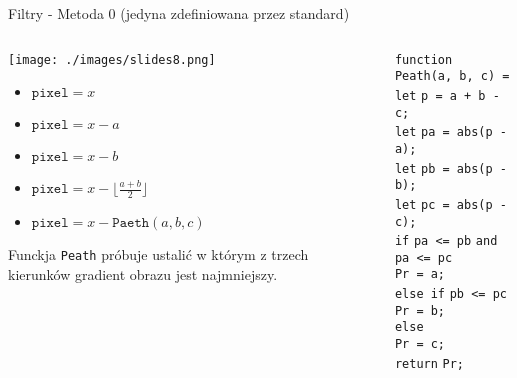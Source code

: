\documentclass[presentation]{beamer}
\begin{document}
\begin{frame}[label={sec:org14c6761}]{Filtry - Metoda 0 (jedyna zdefiniowana przez standard)}
\begin{columns}
\begin{column}{0.50\columnwidth}
\begin{center}
\texttt{[image: ./images/slides8.png]}
\end{center}

\begin{itemize}
\item \(\texttt{pixel} = x\)
\item \(\texttt{pixel} = x - a\)
\item \(\texttt{pixel} = x - b\)
\item \(\texttt{pixel} = x - \lfloor \frac{a + b}{2} \rfloor\)
\item \(\texttt{pixel} = x - \texttt{Paeth}(a, b, c)\)
\end{itemize}

\vspace{15pt}
\footnotesize Funckja \texttt{Peath} próbuje ustalić w którym z trzech kierunków gradient obrazu jest najmniejszy.
\end{column}

\begin{column}{0.60\columnwidth}
{\color{blue}\texttt{function}} \texttt{Peath(a, b, c) = } \\
\hspace{15pt} {\color{blue}\texttt{let}} \texttt{p = a + b - c;} \\
\hspace{15pt} {\color{blue}\texttt{let}} \texttt{pa = abs(p - a);} \\
\hspace{15pt} {\color{blue}\texttt{let}} \texttt{pb = abs(p - b);} \\
\hspace{15pt} {\color{blue}\texttt{let}} \texttt{pc = abs(p - c);} \\
\hspace{15pt} {\color{blue}\texttt{if}} \texttt{pa <= pb} {\color{blue}\texttt{and}} \texttt{pa <= pc} \\
\hspace{30pt}  \texttt{Pr = a;} \\
\hspace{15pt} {\color{blue}\texttt{else if}} \texttt{pb <= pc} \\
\hspace{30pt}  \texttt{Pr = b;} \\
\hspace{15pt} {\color{blue}\texttt{else}} \\
\hspace{30pt}  \texttt{Pr = c;} \\
\hspace{15pt} {\color{blue}\texttt{return}} \texttt{Pr;}
\end{column}
\end{columns}
\end{frame}
\end{document}
